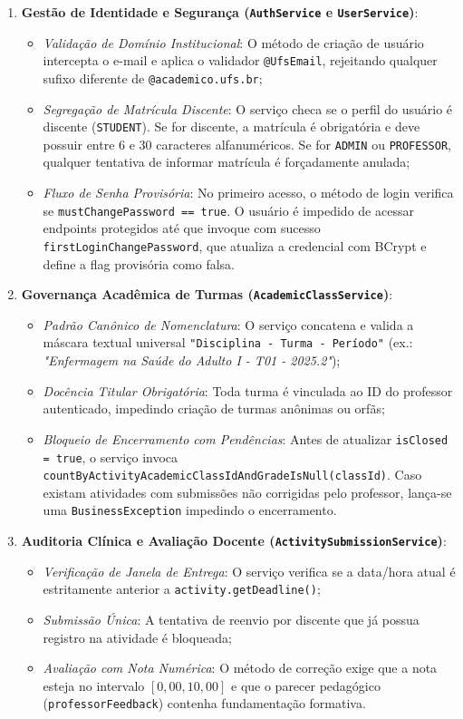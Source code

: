 \begin{enumerate}
    \item \textbf{Gestão de Identidade e Segurança (\texttt{AuthService} e \texttt{UserService})}:
    \begin{itemize}
        \item \textit{Validação de Domínio Institucional}: O método de criação de usuário intercepta o e-mail e aplica o validador \texttt{@UfsEmail}, rejeitando qualquer sufixo diferente de \texttt{@academico.ufs.br};
        \item \textit{Segregação de Matrícula Discente}: O serviço checa se o perfil do usuário é discente (\texttt{STUDENT}). Se for discente, a matrícula é obrigatória e deve possuir entre 6 e 30 caracteres alfanuméricos. Se for \texttt{ADMIN} ou \texttt{PROFESSOR}, qualquer tentativa de informar matrícula é forçadamente anulada;
        \item \textit{Fluxo de Senha Provisória}: No primeiro acesso, o método de login verifica se \texttt{mustChangePassword == true}. O usuário é impedido de acessar endpoints protegidos até que invoque com sucesso \texttt{firstLoginChangePassword}, que atualiza a credencial com BCrypt e define a flag provisória como falsa.
    \end{itemize}

    \item \textbf{Governança Acadêmica de Turmas (\texttt{AcademicClassService})}:
    \begin{itemize}
        \item \textit{Padrão Canônico de Nomenclatura}: O serviço concatena e valida a máscara textual universal \texttt{"Disciplina - Turma - Período"} (ex.: \textit{"Enfermagem na Saúde do Adulto I - T01 - 2025.2"});
        \item \textit{Docência Titular Obrigatória}: Toda turma é vinculada ao ID do professor autenticado, impedindo criação de turmas anônimas ou orfãs;
        \item \textit{Bloqueio de Encerramento com Pendências}: Antes de atualizar \texttt{isClosed = true}, o serviço invoca \texttt{countByActivityAcademicClassIdAndGradeIsNull(classId)}. Caso existam atividades com submissões não corrigidas pelo professor, lança-se uma \texttt{BusinessException} impedindo o encerramento.
    \end{itemize}

    \item \textbf{Auditoria Clínica e Avaliação Docente (\texttt{ActivitySubmissionService})}:
    \begin{itemize}
        \item \textit{Verificação de Janela de Entrega}: O serviço verifica se a data/hora atual é estritamente anterior a \texttt{activity.getDeadline()};
        \item \textit{Submissão Única}: A tentativa de reenvio por discente que já possua registro na atividade é bloqueada;
        \item \textit{Avaliação com Nota Numérica}: O método de correção exige que a nota esteja no intervalo $[0{,}00, 10{,}00]$ e que o parecer pedagógico (\texttt{professorFeedback}) contenha fundamentação formativa.
    \end{itemize}


\end{enumerate}
